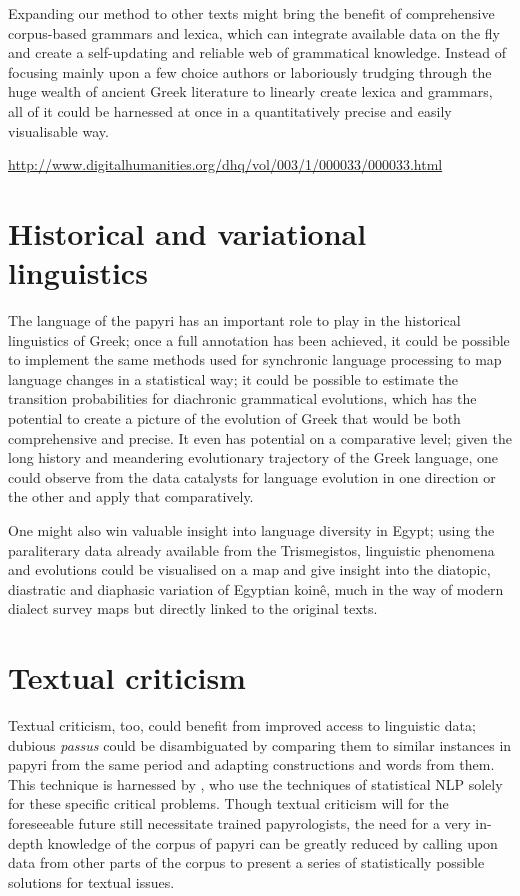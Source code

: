 Expanding our method to other texts might bring the benefit of comprehensive
corpus-based grammars and lexica, which can integrate available data on the fly
and create a self-updating and reliable web of grammatical knowledge. Instead
of focusing mainly upon a few choice authors or laboriously trudging through
the huge wealth of ancient Greek literature to linearly create lexica and
grammars, all of it could be harnessed at once in a quantitatively precise and
easily visualisable way.

\url{http://www.digitalhumanities.org/dhq/vol/003/1/000033/000033.html}


\section{Historical and variational linguistics} %
\label{sec:histlinguistics}

The language of the papyri has an important role to play in the historical
linguistics of Greek; once a full annotation has been achieved, it could be
possible to implement the same methods used for synchronic language processing
to map language changes in a statistical way; it could be possible to estimate
the transition probabilities for diachronic grammatical evolutions, which has
the potential to create a picture of the evolution of Greek that would be both
comprehensive and precise. It even has potential on a comparative level; given
the long history and meandering evolutionary trajectory of the Greek language,
one could observe from the data catalysts for language evolution in one
direction or the other and apply that comparatively.

One might also win valuable insight into language diversity in Egypt; using the
paraliterary data already available from the Trismegistos, linguistic phenomena
and evolutions could be visualised on a map and give insight into the diatopic,
diastratic and diaphasic variation of Egyptian koin\^e, much in the way of
modern dialect survey maps but directly linked to the original texts.


\section{Textual criticism} %
\label{sec:textualcriticism}

Textual criticism, too, could benefit from improved access to linguistic data;
dubious \textit{passus} could be disambiguated by comparing them to similar
instances in papyri from the same period and adapting constructions and words
from them.  This technique is harnessed by \citet{mimno2009}, who use the
techniques of statistical NLP solely for these specific critical problems.
Though textual criticism will for the foreseeable future still necessitate
trained papyrologists, the need for a very in-depth knowledge of the corpus of
papyri can be greatly reduced by calling upon data from other parts of the
corpus to present a series of statistically possible solutions for textual
issues.

